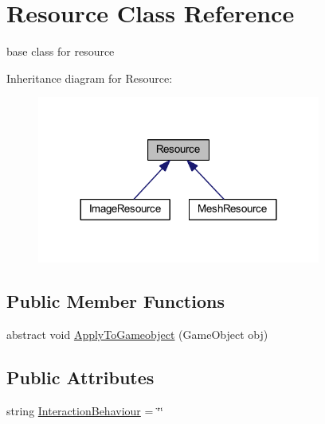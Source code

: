 \hypertarget{class_resource}{}\section{Resource Class Reference}
\label{class_resource}


base class for resource  




Inheritance diagram for Resource\+:
\nopagebreak
\begin{figure}[H]
\begin{center}
\leavevmode
\includegraphics[width=264pt]{class_resource__inherit__graph}
\end{center}
\end{figure}
\subsection*{Public Member Functions}
\begin{DoxyCompactItemize}
\item 
abstract void \mbox{\hyperlink{class_resource_a2461ea96169926a858f02ebaf94157fb}{Apply\+To\+Gameobject}} (Game\+Object obj)
\end{DoxyCompactItemize}
\subsection*{Public Attributes}
\begin{DoxyCompactItemize}
\item 
string \mbox{\hyperlink{class_resource_ae22d064310b77c0071076c8978b74b61}{Interaction\+Behaviour}} = \char`\"{}\char`\"{}
\end{DoxyCompactItemize}
